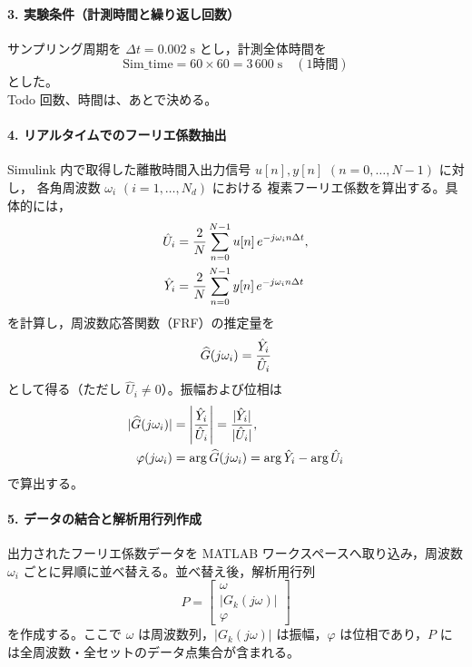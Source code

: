 \paragraph{3. 実験条件（計測時間と繰り返し回数）}
サンプリング周期を
\(
  \Delta t = 0.002\;\mathrm{s}
\)
とし，計測全体時間を
{\small
\[
  \mathrm{Sim\_time} = 60 \times 60 = 3\,600\;\mathrm{s} \quad (1\mathrm{時間})
\]
}
とした。\\
Todo 回数、時間は、あとで決める。

\paragraph{4. リアルタイムでのフーリエ係数抽出}
Simulink 内で取得した離散時間入出力信号 $u[n], y[n]$ $(n=0,\dots,N-1)$ に対し，
各角周波数 $\omega_i$ $(i=1,\dots,N_d)$ における
複素フーリエ係数を算出する。具体的には，
{\small
\begin{align}
  \hat{U}_i &= \frac{2}{N}\sum_{n=0}^{N-1} u[n]\,e^{-j\omega_i n\Delta t}, \notag\\
  \hat{Y}_i &= \frac{2}{N}\sum_{n=0}^{N-1} y[n]\,e^{-j\omega_i n\Delta t} \notag
\end{align}
}
を計算し，周波数応答関数（FRF）の推定量を
{\small
\begin{equation}
  \widehat{G}(j\omega_i) = \frac{\hat{Y}_i}{\hat{U}_i} \notag
\end{equation}
}
として得る（ただし $\hat{U}_i \neq 0$）。振幅および位相は
{\small
\begin{align}
  |\widehat{G}(j\omega_i)| 
    &= \left|\frac{\hat{Y}_i}{\hat{U}_i}\right|
    = \frac{|\hat{Y}_i|}{|\hat{U}_i|}, \notag\\
  \varphi(j\omega_i) 
    &= \arg\widehat{G}(j\omega_i) 
    = \arg\hat{Y}_i - \arg\hat{U}_i \notag
\end{align}
}
で算出する。

\paragraph{5. データの結合と解析用行列作成}
出力されたフーリエ係数データを MATLAB ワークスペースへ取り込み，周波数 \(\omega_i\) ごとに昇順に並べ替える。並べ替え後，解析用行列
{\small
\[
  P =
  \begin{bmatrix}
    \omega \\
    |G_k(j\omega)| \\
    \varphi
  \end{bmatrix}
\]
}
を作成する。ここで \(\omega\) は周波数列，\(|G_k(j\omega)|\) は振幅，\(\varphi\) は位相であり，\(P\) には全周波数・全セットのデータ点集合が含まれる。

